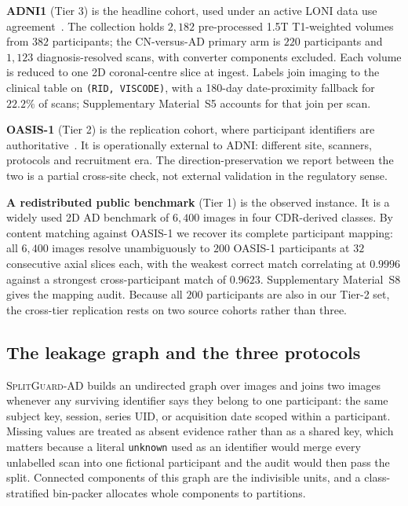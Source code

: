 \documentclass[pdflatex,sn-vancouver-num]{sn-jnl}
\newcommand{\SGA}{\textsc{SplitGuard-AD}}
\begin{document}
\textbf{ADNI1} (Tier 3) is the headline cohort, used under an active LONI data
use agreement~\cite{adni,jack2008adnimri,petersen2010adniclinical}. The
collection holds $2{,}182$ pre-processed 1.5T T1-weighted volumes from $382$
participants; the CN-versus-AD primary arm is $220$ participants and $1{,}123$
diagnosis-resolved scans, with converter components excluded. Each volume is
reduced to one 2D coronal-centre slice at ingest. Labels join imaging to the
clinical table on \texttt{(RID, VISCODE)}, with a 180-day date-proximity
fallback for $22.2\%$ of scans; Supplementary Material~S5 accounts for that join
per scan.

\textbf{OASIS-1} (Tier 2) is the replication cohort, where participant
identifiers are authoritative~\cite{oasis1}. It is operationally external to
ADNI: different site, scanners, protocols and recruitment era. The
direction-preservation we report between the two is a partial cross-site check,
not external validation in the regulatory sense.

\textbf{A redistributed public benchmark} (Tier 1) is the observed instance.
It is a widely used 2D AD benchmark of $6{,}400$ images in four CDR-derived
classes. By content matching against OASIS-1 we recover its complete
participant mapping: all $6{,}400$ images resolve unambiguously to $200$
OASIS-1 participants at $32$ consecutive axial slices each, with the weakest
correct match correlating at $0.9996$ against a strongest cross-participant
match of $0.9623$. Supplementary Material~S8 gives the mapping audit. Because
all $200$ participants are also in our Tier-2 set, the cross-tier replication
rests on two source cohorts rather than three.

\subsection{The leakage graph and the three protocols}
\label{sec:leakage_graph}

\SGA{} builds an undirected graph over images and joins two images whenever any
surviving identifier says they belong to one participant: the same subject key,
session, series UID, or acquisition date scoped within a participant. Missing
values are treated as absent evidence rather than as a shared key, which matters
because a literal \texttt{unknown} used as an identifier would merge every
unlabelled scan into one fictional participant and the audit would then pass the
split. Connected components of this graph are the indivisible units, and a
class-stratified bin-packer allocates whole components to partitions.
\end{document}
